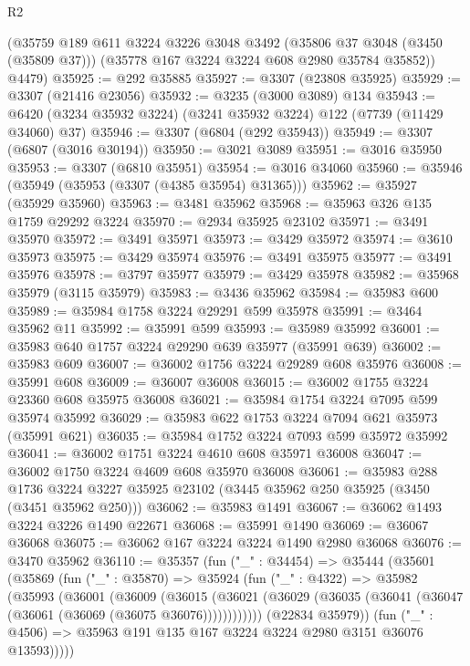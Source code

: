 \begin{lexlean}{R2}
\begin{coremodule}
      (@35759
        @189
        @611
        @3224
        @3226
        @3048
        @3492
        (@35806 @37 @3048 (@3450 (@35809 @37)))
        (@35778 @167 @3224 @3224 @608 @2980 @35784 @35852))
      @4479)
@35925 := @292 @35885
@35927 := @3307 (@23808 @35925)
@35929 := @3307 (@21416 @23056)
@35932 := @3235 (@3000 @3089) @134
@35943 := @6420 (@3234 @35932 @3224) (@3241 @35932 @3224) @122 (@7739 (@11429 @34060) @37)
@35946 := @3307 (@6804 (@292 @35943))
@35949 := @3307 (@6807 (@3016 @30194))
@35950 := @3021 @3089
@35951 := @3016 @35950
@35953 := @3307 (@6810 @35951)
@35954 := @3016 @34060
@35960 := @35946 (@35949 (@35953 (@3307 (@4385 @35954) @31365)))
@35962 := @35927 (@35929 @35960)
@35963 := @3481 @35962
@35968 := @35963 @326 @135 @1759 @29292 @3224
@35970 := @2934 @35925 @23102
@35971 := @3491 @35970
@35972 := @3491 @35971
@35973 := @3429 @35972
@35974 := @3610 @35973
@35975 := @3429 @35974
@35976 := @3491 @35975
@35977 := @3491 @35976
@35978 := @3797 @35977
@35979 := @3429 @35978
@35982 := @35968 @35979 (@3115 @35979)
@35983 := @3436 @35962
@35984 := @35983 @600
@35989 := @35984 @1758 @3224 @29291 @599 @35978
@35991 := @3464 @35962 @11
@35992 := @35991 @599
@35993 := @35989 @35992
@36001 := @35983 @640 @1757 @3224 @29290 @639 @35977 (@35991 @639)
@36002 := @35983 @609
@36007 := @36002 @1756 @3224 @29289 @608 @35976
@36008 := @35991 @608
@36009 := @36007 @36008
@36015 := @36002 @1755 @3224 @23360 @608 @35975 @36008
@36021 := @35984 @1754 @3224 @7095 @599 @35974 @35992
@36029 := @35983 @622 @1753 @3224 @7094 @621 @35973 (@35991 @621)
@36035 := @35984 @1752 @3224 @7093 @599 @35972 @35992
@36041 := @36002 @1751 @3224 @4610 @608 @35971 @36008
@36047 := @36002 @1750 @3224 @4609 @608 @35970 @36008
@36061 := @35983
    @288
    @1736
    @3224
    @3227
    @35925
    @23102
    (@3445 @35962 @250 @35925 (@3450 (@3451 @35962 @250)))
@36062 := @35983 @1491
@36067 := @36062 @1493 @3224 @3226 @1490 @22671
@36068 := @35991 @1490
@36069 := @36067 @36068
@36075 := @36062 @167 @3224 @3224 @1490 @2980 @36068
@36076 := @3470 @35962
@36110 := @35357
    (fun ("_" : @34454) =>
    @35444
      (@35601
        (@35869
          (fun ("_" : @35870) =>
          @35924
            (fun ("_" : @4322) =>
            @35982
              (@35993
                (@36001
                  (@36009
                    (@36015
                      (@36021
                        (@36029 (@36035 (@36041 (@36047 (@36061 (@36069 (@36075 @36076))))))))))))
              (@22834 @35979))
            (fun ("_" : @4506) => @35963 @191 @135 @167 @3224 @3224 @2980 @3151 @36076 @13593)))))

\end{coremodule}
\end{lexlean}
